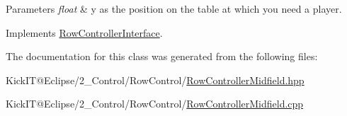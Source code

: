 \begin{DoxyParams}{Parameters}
{\em float} & y as the position on the table at which you need a player. \\
\hline
\end{DoxyParams}


Implements \hyperlink{class_row_controller_interface_a66c9b362e84b2207a18726d8248505eb}{Row\+Controller\+Interface}.



The documentation for this class was generated from the following files\+:\begin{DoxyCompactItemize}
\item 
Kick\+I\+T@\+Eclipse/2\+\_\+\+Control/\+Row\+Control/\hyperlink{_row_controller_midfield_8hpp}{Row\+Controller\+Midfield.\+hpp}\item 
Kick\+I\+T@\+Eclipse/2\+\_\+\+Control/\+Row\+Control/\hyperlink{_row_controller_midfield_8cpp}{Row\+Controller\+Midfield.\+cpp}\end{DoxyCompactItemize}
